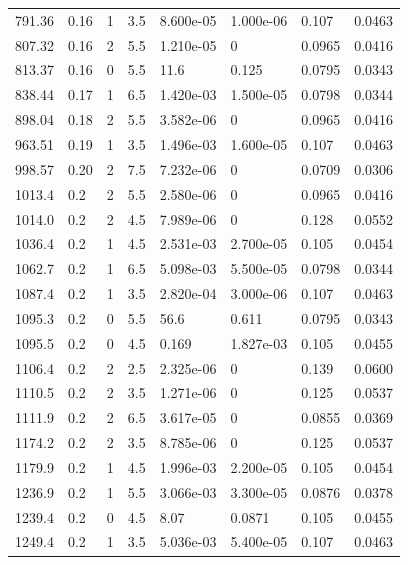 \documentclass[preview]{standalone}
\begin{document}
{{{\begin{tabular}{L{1.2cm}C{1.2cm} C{0.3cm}C{0.5cm} C{1.4cm}C{1.4cm} C{1.4cm}C{1.4cm}}
  791.36  &  0.16  & 1     & 3.5 &  8.600e-05  & 1.000e-06  & 0.107 &  0.0463   \\ 
  807.32  &  0.16  & 2     & 5.5 &  1.210e-05  & 0  & 0.0965 &  0.0416   \\ 
  813.37  &  0.16  & 0     & 5.5 &  11.6  & 0.125  & 0.0795 &  0.0343   \\ 
  838.44  &  0.17  & 1     & 6.5 &  1.420e-03  & 1.500e-05  & 0.0798 &  0.0344   \\ 
  898.04  &  0.18  & 2     & 5.5 &  3.582e-06  & 0  & 0.0965 &  0.0416   \\ 
  963.51  &  0.19  & 1     & 3.5 &  1.496e-03  & 1.600e-05  & 0.107 &  0.0463   \\ 
  998.57  &  0.20  & 2     & 7.5 &  7.232e-06  & 0  & 0.0709 &  0.0306   \\ 
  1013.4  &   0.2  & 2     & 5.5 &  2.580e-06  & 0  & 0.0965 &  0.0416   \\ 
  1014.0  &   0.2  & 2     & 4.5 &  7.989e-06  & 0  & 0.128 &  0.0552   \\ 
  1036.4  &   0.2  & 1     & 4.5 &  2.531e-03  & 2.700e-05  & 0.105 &  0.0454   \\ 
  1062.7  &   0.2  & 1     & 6.5 &  5.098e-03  & 5.500e-05  & 0.0798 &  0.0344   \\ 
  1087.4  &   0.2  & 1     & 3.5 &  2.820e-04  & 3.000e-06  & 0.107 &  0.0463   \\ 
  1095.3  &   0.2  & 0     & 5.5 &  56.6  & 0.611  & 0.0795 &  0.0343   \\ 
  1095.5  &   0.2  & 0     & 4.5 &  0.169  & 1.827e-03  & 0.105 &  0.0455   \\ 
  1106.4  &   0.2  & 2     & 2.5 &  2.325e-06  & 0  & 0.139 &  0.0600   \\ 
  1110.5  &   0.2  & 2     & 3.5 &  1.271e-06  & 0  & 0.125 &  0.0537   \\ 
  1111.9  &   0.2  & 2     & 6.5 &  3.617e-05  & 0  & 0.0855 &  0.0369   \\ 
  1174.2  &   0.2  & 2     & 3.5 &  8.785e-06  & 0  & 0.125 &  0.0537   \\ 
  1179.9  &   0.2  & 1     & 4.5 &  1.996e-03  & 2.200e-05  & 0.105 &  0.0454   \\ 
  1236.9  &   0.2  & 1     & 5.5 &  3.066e-03  & 3.300e-05  & 0.0876 &  0.0378   \\ 
  1239.4  &   0.2  & 0     & 4.5 &  8.07  & 0.0871  & 0.105 &  0.0455   \\ 
  1249.4  &   0.2  & 1     & 3.5 &  5.036e-03  & 5.400e-05  & 0.107 &  0.0463   \\ 

\end{tabular}}}}
\end{document}
